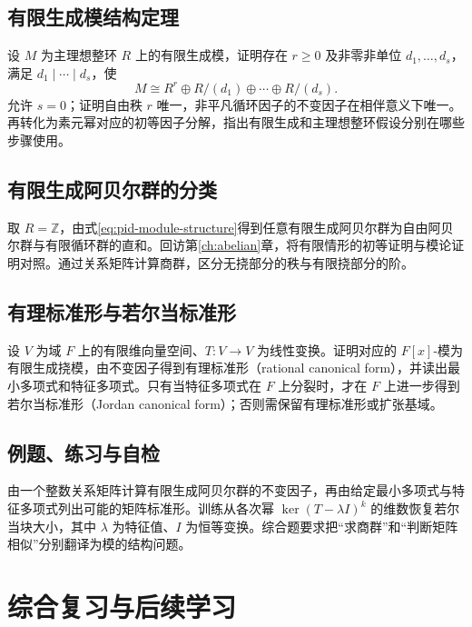 \documentclass[UTF8,12pt,a4paper,fontset=fandol]{ctexbook}
\begin{document}
\section{有限生成模结构定理}
设 $M$ 为主理想整环 $R$ 上的有限生成模，证明存在 $r\geq0$ 及非零非单位 $d_1,\ldots,d_s$，满足 $d_1\mid\cdots\mid d_s$，使
\begin{equation}\label{eq:pid-module-structure}
  M\cong R^r\oplus R/(d_1)\oplus\cdots\oplus R/(d_s).
\end{equation}
允许 $s=0$；证明自由秩 $r$ 唯一，非平凡循环因子的不变因子在相伴意义下唯一。再转化为素元幂对应的初等因子分解，指出有限生成和主理想整环假设分别在哪些步骤使用。

\section{有限生成阿贝尔群的分类}
取 $R=\mathbb Z$，由式\eqref{eq:pid-module-structure}得到任意有限生成阿贝尔群为自由阿贝尔群与有限循环群的直和。回访第\ref{ch:abelian}章，将有限情形的初等证明与模论证明对照。通过关系矩阵计算商群，区分无挠部分的秩与有限挠部分的阶。

\section{有理标准形与若尔当标准形}
设 $V$ 为域 $F$ 上的有限维向量空间、$T:V\to V$ 为线性变换。证明对应的 $F[x]$-模为有限生成挠模，由不变因子得到有理标准形（rational canonical form），并读出最小多项式和特征多项式。只有当特征多项式在 $F$ 上分裂时，才在 $F$ 上进一步得到若尔当标准形（Jordan canonical form）；否则需保留有理标准形或扩张基域。

\section{例题、练习与自检}
由一个整数关系矩阵计算有限生成阿贝尔群的不变因子，再由给定最小多项式与特征多项式列出可能的矩阵标准形。训练从各次幂 $\ker(T-\lambda I)^k$ 的维数恢复若尔当块大小，其中 $\lambda$ 为特征值、$I$ 为恒等变换。综合题要求把“求商群”和“判断矩阵相似”分别翻译为模的结构问题。

\backmatter
\chapter{综合复习与后续学习}
\end{document}
